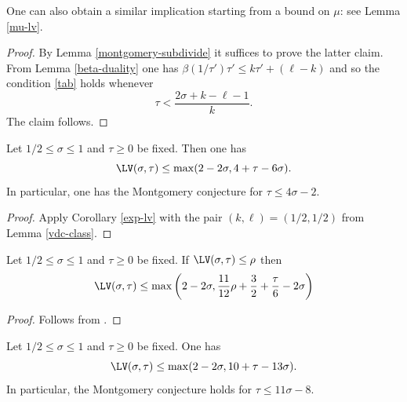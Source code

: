 One can also obtain a similar implication starting from a bound on $\mu$: see Lemma \ref{mu-lv}.

\begin{proof}  By Lemma \ref{montgomery-subdivide} it suffices to prove the latter claim.  From Lemma \ref{beta-duality} one has
    $\beta(1/\tau') \tau' \leq k \tau' + (\ell-k)$
and so the condition \eqref{tab} holds whenever
$$ \tau < \frac{2\sigma+k-\ell-1}{k}.$$
The claim follows.
\end{proof}

\begin{theorem}\label{huxley-lv}\cite[Equation~(2.9)]{Huxley} Let $1/2 \leq \sigma \leq 1$ and $\tau \geq 0$ be fixed.  Then one has
    $$ \LV(\sigma,\tau) \leq \max( 2-2\sigma, 4 + \tau - 6 \sigma).$$
    In particular, one has the Montgomery conjecture for $\tau \leq 4 \sigma - 2$.
\end{theorem}

\literature
{}

\begin{proof}  Apply Corollary \ref{exp-lv} with the pair $(k,\ell) = (1/2,1/2)$ from Lemma \ref{vdc-class}.
\end{proof}


\begin{theorem}\label{heath_brown-lv-prelim} Let $1/2 \leq \sigma \leq 1$ and $\tau \geq 0$ be fixed.  If $\LV(\sigma, \tau) \le \rho$ then
    \[
    \LV(\sigma, \tau) \le \max\left(2 - 2\sigma, \frac{11}{12}\rho + \frac{3}{2} + \frac{\tau}{6} - 2\sigma\right)
    \]
\end{theorem}

\begin{proof}
    Follows from \cite[Lemma~1]{heathbrown_zero_1979}.
\end{proof}

\begin{theorem}\label{hb-opt} Let $1/2 \leq \sigma \leq 1$ and $\tau \geq 0$ be fixed.   One has
    $$ \LV(\sigma,\tau) \leq \max( 2-2\sigma, 10 + \tau - 13 \sigma).$$
In particular, the Montgomery conjecture holds for $\tau \leq 11 \sigma - 8$.
\end{theorem}


\literature
{}

